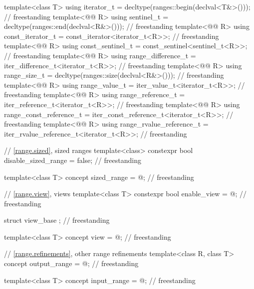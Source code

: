 \begin{codeblock}
{  template<class T>
    using iterator_t = decltype(ranges::begin(declval<T&>()));                      // freestanding
  template<@@ R>
    using sentinel_t = decltype(ranges::end(declval<R&>()));                        // freestanding
  template<@@ R>
    using const_iterator_t = const_iterator<iterator_t<R>>;                         // freestanding
  template<@@ R>
    using const_sentinel_t = const_sentinel<sentinel_t<R>>;                         // freestanding
  template<@@ R>
    using range_difference_t = iter_difference_t<iterator_t<R>>;                    // freestanding
  template<@@ R>
    using range_size_t = decltype(ranges::size(declval<R&>()));                     // freestanding
  template<@@ R>
    using range_value_t = iter_value_t<iterator_t<R>>;                              // freestanding
  template<@@ R>
    using range_reference_t = iter_reference_t<iterator_t<R>>;                      // freestanding
  template<@@ R>
    using range_const_reference_t = iter_const_reference_t<iterator_t<R>>;          // freestanding
  template<@@ R>
    using range_rvalue_reference_t = iter_rvalue_reference_t<iterator_t<R>>;        // freestanding

  // \ref{range.sized}, sized ranges
  template<class>
    constexpr bool disable_sized_range = false;                                     // freestanding

  template<class T>
    concept sized_range = @\seebelow@;                                                // freestanding

  // \ref{range.view}, views
  template<class T>
    constexpr bool enable_view = @\seebelow@;                                         // freestanding

  struct view_base {};                                                              // freestanding

  template<class T>
    concept view = @\seebelow@;                                                       // freestanding

  // \ref{range.refinements}, other range refinements
  template<class R, class T>
    concept output_range = @\seebelow@;                                               // freestanding

  template<class T>
    concept input_range = @\seebelow@;                                                // freestanding

}
\end{codeblock}
